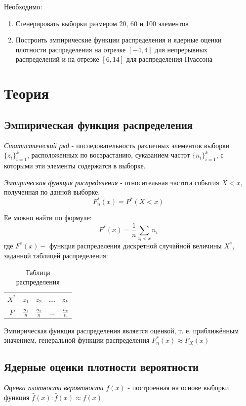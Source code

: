 \documentclass[12pt,a4paper]{article}
\begin{document}
Необходимо:
\begin{enumerate}
    \item Сгенерировать выборки размером 20, 60 и 100 элементов
    \item Построить эмпирические функции распределения и ядерные оценки плотности распределения на отрезке $[-4, 4]$ для непрерывных распределений и на отрезке $[6, 14]$ для распределения Пуассона
\end{enumerate}

\section{Теория}
\subsection{Эмпирическая функция распределения}
\textit{Статистический ряд} - последовательность различных элементов выборки ${\{z_i\}}_{i=1}^k$, расположенных по восзрастанию, суказанием частот ${\{n_i\}}_{i=1}^k$, с которыми эти элементы содержатся в выборке.

\textit{Эмпирическая функция распределения} - относительная частота события $X<x$, полученная по данной выборке:
\begin{equation}
    F_n^*(x)=P^*(X<x)
\end{equation}

Ее можно найти по формуле:
\begin{equation}
    F^*(x)=\frac{1}{n}\sum_{z_i<x}n_i
\end{equation}
где $F^*(x)-$ функция распределения дискретной случайной величины $X^*$, заданной таблицей распределения:
\begin{table}[H]
    \centering
    \begin{tabular}{|c|c|c|c|c|}
        \hline
         $X^*$ & $z_1$ & $z_2$ & ... & $z_k$\\
         \hline
         $P$ & $\frac{n_1}{n}$ & $\frac{n_2}{n}$ & ... & $\frac{n_k}{n}$\\
         \hline
    \end{tabular}
    \caption{Таблица распределения}
\end{table}
Эмпирическая функция распределения является оценкой, т. е. приближённым значением, генеральной функции распределения $F_n^*(x)\approx F_X(x)$

\subsection{Ядерные оценки плотности вероятности}
\textit{Оценка плотности вероятности $f(x)$} - построенная на основе выборки функция $\widehat{f}(x):\widehat{f}(x)\approx f(x)$
\end{document}
